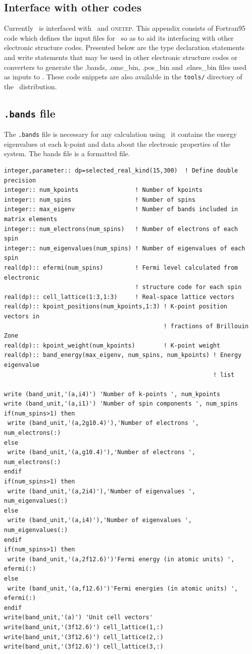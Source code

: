 \documentclass[a4paper,11pt,twoside]{book}
\begin{document}
{\begin{appendix}

\chapter{Interface with other codes}
Currently \optados\ is interfaced with \castep\ and \textsc{onetep}.
%
This appendix consists of Fortran95 code which defines the input files for \optados\ so as to aid its interfacing with other electronic structure codes.
%
Presented below are the type declaration statements and write statements that may be used in other electronic structure codes or converters to generate the .bands, .ome\_bin, .pos\_bin and .elnes\_bin files used as inputs to \optados.
%
These code snippets are also available in the \texttt{tools/} directory of the \optados\ distribution.

\section{\texttt{.bands} file}
The \texttt{.bands} file is necessary for any calculation using \optados\ it contains the energy eigenvalues at each k-point and data about the electronic properties of the system.
%
The bands file is a formatted file.
\begin{verbatim}
integer,parameter:: dp=selected_real_kind(15,300)  ! Define double precision
integer:: num_kpoints                ! Number of kpoints
integer:: num_spins                  ! Number of spins
integer:: max_eigenv                 ! Number of bands included in matrix elements
integer:: num_electrons(num_spins)   ! Number of electrons of each spin
integer:: num_eigenvalues(num_spins) ! Number of eigenvalues of each spin
real(dp):: efermi(num_spins)         ! Fermi level calculated from electronic 
                                     ! structure code for each spin           
real(dp):: cell_lattice(1:3,1:3)     ! Real-space lattice vectors
real(dp):: kpoint_positions(num_kpoints,1:3) ! K-point position vectors in 
                                             ! fractions of Brillouin Zone
real(dp):: kpoint_weight(num_kpoints)        ! K-point weight
real(dp):: band_energy(max_eigenv, num_spins, num_kpoints) ! Energy eigenvalue 
                                                           ! list
                                          
write (band_unit,'(a,i4)') 'Number of k-points ', num_kpoints
write (band_unit,'(a,i1)') 'Number of spin components ', num_spins
if(num_spins>1) then
 write (band_unit,'(a,2g10.4)'),'Number of electrons ', num_electrons(:)
else
 write (band_unit,'(a,g10.4)'),'Number of electrons ', num_electrons(:)
endif
if(num_spins>1) then
 write (band_unit,'(a,2i4)'),'Number of eigenvalues ', num_eigenvalues(:)
else
 write (band_unit,'(a,i4)'),'Number of eigenvalues ', num_eigenvalues(:)
endif
if(num_spins>1) then
 write (band_unit,'(a,2f12.6)')'Fermi energy (in atomic units) ', efermi(:)
else
 write (band_unit,'(a,f12.6)')'Fermi energies (in atomic units) ', efermi(:)
endif
write(band_unit,'(a)') 'Unit cell vectors'
write(band_unit,'(3f12.6)') cell_lattice(1,:)
write(band_unit,'(3f12.6)') cell_lattice(2,:)
write(band_unit,'(3f12.6)') cell_lattice(3,:)


\end{verbatim}
\end{appendix}}
\end{document}
